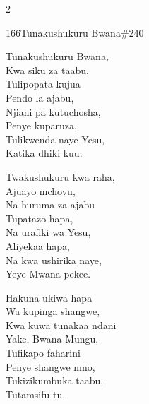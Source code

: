 \begin{multicols}{2}
\begin{hymn}{166}{Tunakushukuru Bwana}{\#240}
\begin{stanza}
Tunakushukuru Bwana,\\
Kwa siku za taabu,\\
Tulipopata kujua\\
Pendo la ajabu,\\
Njiani pa kutuchosha,\\
Penye kuparuza,\\
Tulikwenda naye Yesu,\\
Katika dhiki kuu.
\end{stanza}
\begin{stanza}
Twakushukuru kwa raha,\\
Ajuayo mchovu,\\
Na huruma za ajabu\\
Tupatazo hapa,\\
Na urafiki wa Yesu,\\
Aliyekaa hapa,\\
Na kwa ushirika naye,\\
Yeye Mwana pekee.
\end{stanza}
\begin{stanza}
Hakuna ukiwa hapa\\
Wa kupinga shangwe,\\
Kwa kuwa tunakaa ndani\\
Yake, Bwana Mungu,\\
Tufikapo faharini\\
Penye shangwe mno,\\
Tukizikumbuka taabu,\\
Tutamsifu tu.
\end{stanza}
\end{hymn}


\end{multicols}
